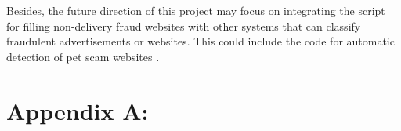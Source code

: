 \documentclass[ oneside,%
                    author={Cassie Qing Tang},
                    degree={BSc},
                     title={An Automated Response System for Disrupting Online Pet Scamming \\ },
                    subtitle={ }]{dissertation}
\begin{document}
Besides, the future direction of this project may focus on integrating the script for filling non-delivery fraud websites with other systems that can classify fraudulent advertisements or websites. This could include the code for automatic detection of pet scam websites \cite{mehmedov_ronel-mehmedovdissertation2021_2021}.



% 


\appendix

\chapter{Appendix A: }
\label{}
\end{document}

